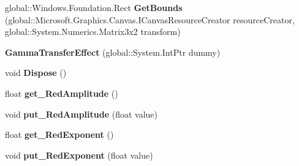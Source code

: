 \begin{DoxyCompactItemize}
global\+::\+Windows.\+Foundation.\+Rect {\bfseries Get\+Bounds} (global\+::\+Microsoft.\+Graphics.\+Canvas.\+I\+Canvas\+Resource\+Creator resource\+Creator, global\+::\+System.\+Numerics.\+Matrix3x2 transform)
\item 
\mbox{\label{class_microsoft_1_1_graphics_1_1_canvas_1_1_effects_1_1_gamma_transfer_effect_acc80116adac830c588156332a0cbd9ec}} 
{\bfseries Gamma\+Transfer\+Effect} (global\+::\+System.\+Int\+Ptr dummy)
\item 
\mbox{\label{class_microsoft_1_1_graphics_1_1_canvas_1_1_effects_1_1_gamma_transfer_effect_a83bd3bcd2df4a6ade3ee108a25f92ac9}} 
void {\bfseries Dispose} ()
\item 
\mbox{\label{class_microsoft_1_1_graphics_1_1_canvas_1_1_effects_1_1_gamma_transfer_effect_ab74b1133eab4608c72e6c33e50c14a99}} 
float {\bfseries get\+\_\+\+Red\+Amplitude} ()
\item 
\mbox{\label{class_microsoft_1_1_graphics_1_1_canvas_1_1_effects_1_1_gamma_transfer_effect_ac877c0c4b86a5c1e90056a92dad7a161}} 
void {\bfseries put\+\_\+\+Red\+Amplitude} (float value)
\item 
\mbox{\label{class_microsoft_1_1_graphics_1_1_canvas_1_1_effects_1_1_gamma_transfer_effect_a744bfb7361792b436940014b783e3f6c}} 
float {\bfseries get\+\_\+\+Red\+Exponent} ()
\item 
\mbox{\label{class_microsoft_1_1_graphics_1_1_canvas_1_1_effects_1_1_gamma_transfer_effect_a8969e3ad451992d1f43567df17274e07}} 
void {\bfseries put\+\_\+\+Red\+Exponent} (float value)
\item 
\mbox{\label{class_microsoft_1_1_graphics_1_1_canvas_1_1_effects_1_1_gamma_transfer_effect_a0b496c45a0ceba5e0a4ab29ee2a4a1d5}} 

\end{DoxyCompactItemize}
